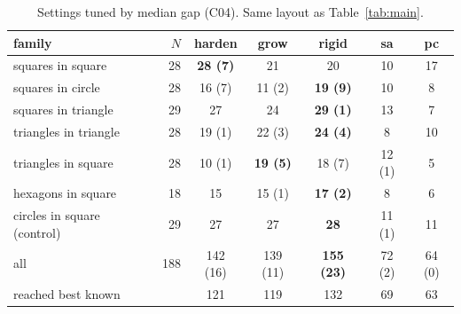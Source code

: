 \begin{table}[t]\centering\small
\begin{tabular}{lrccccc}
\toprule
family & $N$ & \textbf{harden} & \textbf{grow} & \textbf{rigid} & \textbf{sa} & \textbf{pc} \\
\midrule
squares in square & 28 & \textbf{28 (7)} & 21 & 20 & 10 & 17 \\
squares in circle & 28 & 16 (7) & 11 (2) & \textbf{19 (9)} & 10 & 8 \\
squares in triangle & 29 & 27 & 24 & \textbf{29 (1)} & 13 & 7 \\
triangles in triangle & 28 & 19 (1) & 22 (3) & \textbf{24 (4)} & 8 & 10 \\
triangles in square & 28 & 10 (1) & \textbf{19 (5)} & 18 (7) & 12 (1) & 5 \\
hexagons in square & 18 & 15 & 15 (1) & \textbf{17 (2)} & 8 & 6 \\
circles in square (control) & 29 & 27 & 27 & \textbf{28} & 11 (1) & 11 \\
\midrule
all & 188 & 142 (16) & 139 (11) & \textbf{155 (23)} & 72 (2) & 64 (0) \\
reached best known & & 121 & 119 & 132 & 69 & 63 \\
\bottomrule
\end{tabular}
\caption{Settings tuned by median gap (C04). Same layout as Table~\ref{tab:main}.}
\label{tab:median}
\end{table}
